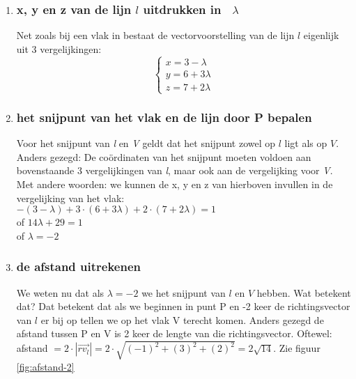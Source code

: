\begin{enumerate}[label=(\alph*)]
\item \subsubsection{x, y en z van de lijn $  l $  uitdrukken in \ $  \lambda $}
Net zoals bij een vlak in \RD bestaat de vectorvoorstelling van de lijn $ l  $ eigenlijk uit 3 vergelijkingen:
\[\begin{cases}
x =  3 -\lambda \\
y =  6 + 3\lambda\\
z = 7 + 2\lambda
\end{cases}
\] 
\item \subsubsection{het snijpunt van  het  vlak en de lijn door P bepalen}
Voor het snijpunt van\textit{ l} en \textit{V} geldt dat het snijpunt zowel op $  l $ ligt als op $ V $. Anders gezegd: De coördinaten  van het snijpunt moeten voldoen aan bovenstaande 3 vergelijkingen van\textit{ l}, maar ook aan de vergelijking voor \textit{V}. Met andere woorden: we kunnen de x, y en z van hierboven invullen in de vergelijking van het vlak:\\
$ -(3 -\lambda) + 3\cdot(6 + 3\lambda) + 2\cdot(7 + 2\lambda) = 1$ \\
of $ 14\lambda + 29 = 1 $ \\of $  \lambda = -2 $

\item \subsubsection{de afstand uitrekenen}
We weten nu dat als $  \lambda = -2 $ we het snijpunt van $ l  $ en $ V $ hebben. Wat betekent dat? Dat betekent dat als we beginnen in punt P en -2 keer de richtingsvector van $  l $ er bij op tellen we op het vlak V terecht komen.
Anders gezegd de afstand tussen P en V is 2 keer de lengte van die richtingsvector. Oftewel: 
afstand $ = 2\cdot |\overrightarrow{rv_{l}}| = 2\cdot \sqrt{(-1)^{2} + (3)^{2} + (2)^{2} } = 2\sqrt{14} $. Zie  figuur  \ref{fig:afstand-2}
\end{enumerate}	


